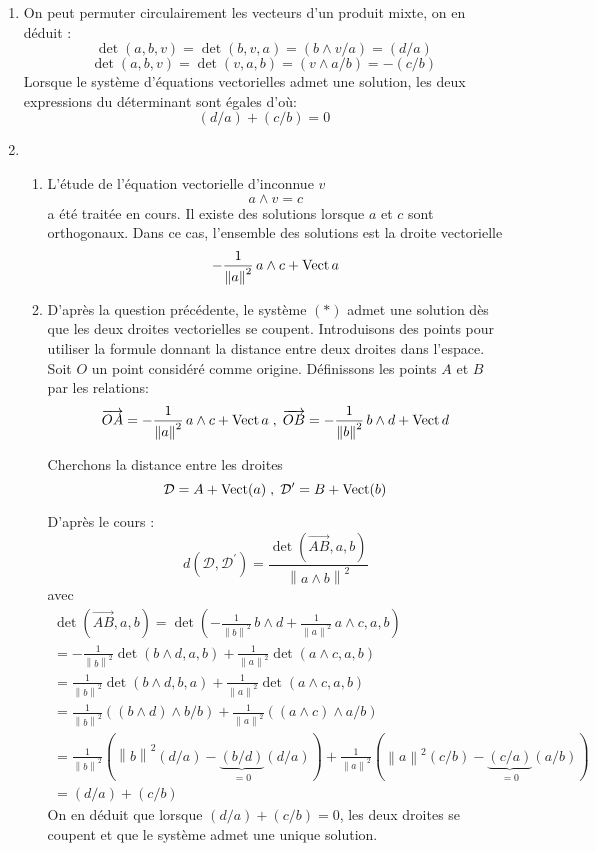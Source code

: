 \begin{enumerate}
\item On peut permuter circulairement les vecteurs d'un produit mixte, on en déduit :
\[\det (a,b,v)= \det(b,v,a)=(b\wedge v / a)=(d/a)\]
\[\det (a,b,v)=\det (v,a,b) = (v\wedge a / b)=-(c/b)\]
Lorsque le système d'équations vectorielles admet une solution, les deux expressions du déterminant sont égales d'où:
\[(d/a)+(c/b)=0\]
\item \begin{enumerate}
 \item 
L'étude de l'équation vectorielle d'inconnue $v$
\[a\wedge v = c\]
a été traitée en cours. Il existe des solutions lorsque $a$ et $c$ sont orthogonaux. Dans ce cas, l'ensemble des solutions est la droite vectorielle
\[-\frac{1}{\left\|a\right\|^2}\, a\wedge c + \operatorname{Vect} a\]
\item D'après la question précédente, le système $(*)$ admet une solution dès que les deux droites vectorielles se coupent. Introduisons des points pour utiliser la formule donnant la distance entre deux droites dans l'espace. \newline
Soit $O$ un point considéré comme origine. Définissons les points $A$ et $B$ par les relations:
\[\overrightarrow{OA}=-\frac{1}{\left\|a\right\|^2}\, a\wedge c + \operatorname{Vect} a \; , \; \overrightarrow{OB}=-\frac{1}{\left\|b\right\|^2}\, b\wedge d + \operatorname{Vect} d\]

Cherchons la distance entre les droites
\[\mathcal{D}=A+\operatorname{Vect} (a) \; ,\; \mathcal{D^\prime}=B+\operatorname{Vect} (b)\]

D'après le cours :
\[
d(\mathcal{D},\mathcal{D^\prime})=\frac{\det(\overrightarrow{AB},a,b)}{\left\|a\wedge b\right\|^2}
\]
avec
\begin{multline*}
\det(\overrightarrow{AB},a,b)
 = \det(-\frac{1}{\left\|b\right\|^2}\, b\wedge d + \frac{1}{\left\|a\right\|^2}\, a\wedge c,a,b)\\
 =  -\frac{1}{\left\|b\right\|^2}\det (b\wedge d,a,b) + \frac{1}{\left\|a\right\|^2} \det (a\wedge c,a,b)\\
 =  \frac{1}{\left\|b\right\|^2}\det (b\wedge d,b,a) + \frac{1}{\left\|a\right\|^2} \det (a\wedge c,a,b)\\
 =  \frac{1}{\left\|b\right\|^2} ((b\wedge d)\wedge b/b) + \frac{1}{\left\|a\right\|^2} ((a\wedge c)\wedge a/b)\\
= \frac{1}{\left\|b\right\|^2}\left (\left\|b\right\|^2 (d/a) -\underbrace{(b/d)}_{=0}(d/a) \right) 
 + 
\frac{1}{\left\|a\right\|^2}\left (\left\|a\right\|^2 (c/b) -\underbrace{(c/a)}_{=0}(a/b) \right)\\
= (d/a)+(c/b)
\end{multline*}
On en déduit que lorsque $(d/a)+(c/b)=0$, les deux droites se coupent et que le système admet une unique solution.
\end{enumerate}

\end{enumerate}